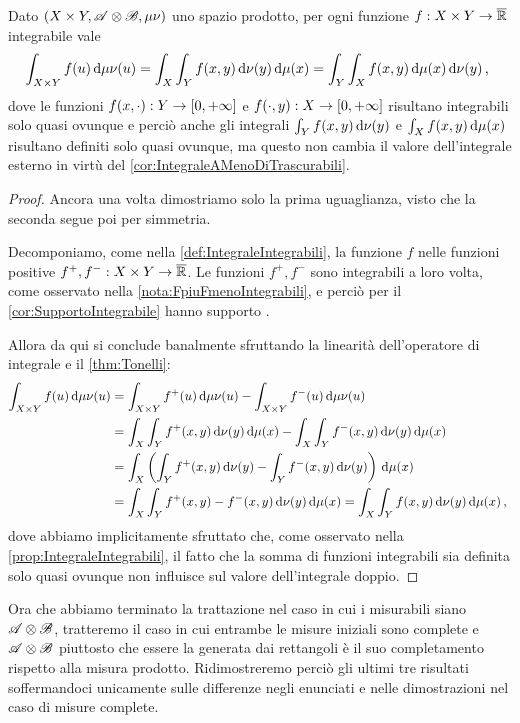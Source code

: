 \begin{theorem}[Fubini]\label{thm:Fubini}
	Dato $(X\times Y,\mathscr A\otimes\mathscr B,\mu\nu)$ uno spazio prodotto, per ogni funzione $f:X\times Y\to\overline{\mathbb R}$ integrabile vale
	\begin{equation*}
		\int_{X\times Y}f(u)\,\mathrm d\mu\nu(u)=\int_X\int_Y f(x,y)\,\mathrm d\nu(y)\,\mathrm d\mu(x)=\int_Y\int_X f(x,y)\,\mathrm d\mu(x)\,\mathrm d\nu(y)\, \text{, }
	\end{equation*}
	dove le funzioni $f(x,\cdot):Y\to[0,+\infty]$ e $f(\cdot,y):X\to[0,+\infty]$ risultano integrabili solo quasi ovunque e perciò anche gli integrali $\int_Y f(x,y)\,\mathrm d\nu(y)$ e $\int_X f(x,y)\,\mathrm d\mu(x)$ risultano definiti solo quasi ovunque, ma questo non cambia il valore dell'integrale esterno in virtù del \cref{cor:IntegraleAMenoDiTrascurabili}.
\end{theorem}
\begin{proof}
	Ancora una volta dimostriamo solo la prima uguaglianza, visto che la seconda segue poi per simmetria.
	
	Decomponiamo, come nella \cref{def:IntegraleIntegrabili}, la funzione $f$ nelle funzioni positive $f^+,f^-:X\times Y\to\overline{\mathbb R}$.
	Le funzioni $f^+,f^-$ sono integrabili a loro volta, come osservato nella \cref{nota:FpiuFmenoIntegrabili}, e perciò per il \cref{cor:SupportoIntegrabile} hanno supporto \sigfin[o].
	
	Allora da qui si conclude banalmente sfruttando la linearità dell'operatore di integrale e il \cref{thm:Tonelli}:
	\begin{align*}
		\int_{X\times Y}f(u)\,\mathrm d\mu\nu(u)
		& =\int_{X\times Y}f^+(u)\,\mathrm d\mu\nu(u)-\int_{X\times Y}f^-(u)\,\mathrm d\mu\nu(u)\\
		&=\int_X\int_Y f^+(x,y)\,\mathrm d\nu(y)\,\mathrm d\mu(x)-\int_X\int_Y f^-(x,y)\,\mathrm d\nu(y)\,\mathrm d\mu(x)\\
		&=\int_X\left(\int_Y f^+(x,y)\,\mathrm d\nu(y)-\int_Y f^-(x,y)\,\mathrm d\nu(y)\right)\,\mathrm d\mu(x)\\
		&=\int_X\int_Y f^+(x,y)-f^-(x,y)\,\mathrm d\nu(y)\,\mathrm d\mu(x)
		=\int_X\int_Y f(x,y)\,\mathrm d\nu(y)\,\mathrm d\mu(x)\, \text{, }
	\end{align*}
	dove abbiamo implicitamente sfruttato che, come osservato nella \cref{prop:IntegraleIntegrabili}, il fatto che la somma di funzioni integrabili sia definita solo quasi ovunque non influisce sul valore dell'integrale doppio.
\end{proof}

Ora che abbiamo terminato la trattazione nel caso in cui i misurabili siano $\mathscr A\otimes\mathscr B$, tratteremo il caso in cui entrambe le misure iniziali sono complete e $\mathscr A\otimes\mathscr B$ piuttosto che essere la \sigalg{} generata dai rettangoli è il suo completamento rispetto alla misura prodotto.
Ridimostreremo perciò gli ultimi tre risultati soffermandoci unicamente sulle differenze negli enunciati e nelle dimostrazioni nel caso di misure complete.

